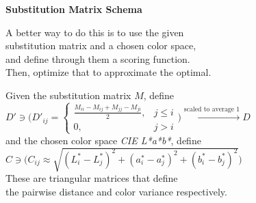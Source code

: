 \documentclass[bigger]{beamer}
\newcommand{\blank}[1]{\hspace*{#1}}
\newcommand{\mysp}{\blank{0.3cm}}
\newcommand{\tb}[1]{\textbf{#1}}
\newcommand{\ti}[1]{\textit{#1}}
\begin{document}
\begin{frame}{\tb{Substitution Matrix Schema}}
    \footnotesize

    A better way to do this is to use the given\\
    substitution matrix and a chosen color space,\\
    and define through them a scoring function.\\
    Then, optimize that to approximate the optimal.

    \hfill

    Given the substitution matrix $M$, define
    \newline\\
    {
        \scriptsize
        \mysp $
        D' \ni \Biggl( D'_{ij} = \begin{cases}
                     \frac{M_{ii} - M_{ij} + M_{jj} - M_{ji}}{2}, &j \leq i\\
                                                               0, &j > i
                  \end{cases} \Biggr)
        \xrightarrow{\text{scaled to average 1}} D
        $
    }
    \newline\\
    and the chosen color space \ti{CIE L*a*b*}, define
    \newline\\
    {
        \scriptsize
        \mysp $
        C \ni \Biggl( C_{ij} \approx \sqrt{(L^*_i - L^*_j)^2 + (a^*_i - a^*_j)^2 + (b^*_i - b^*_j)^2} \Biggr)
        $
    }
    \newline\\
    These are triangular matrices that define\\
    the pairwise distance and color variance respectively.
    
\end{frame}
\end{document}
